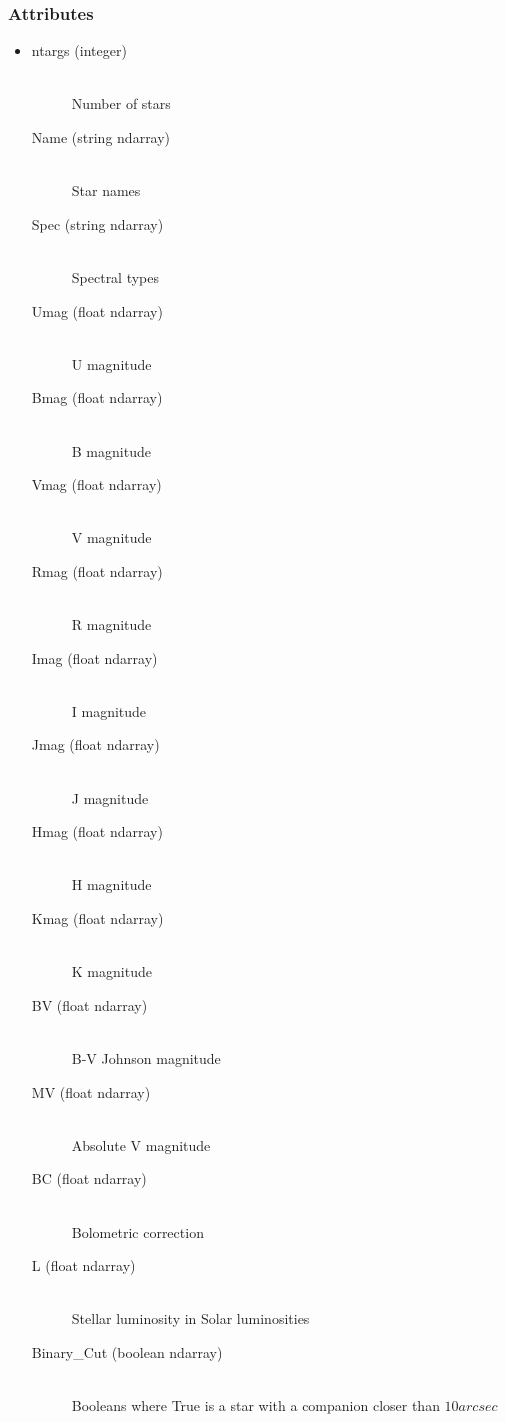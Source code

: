 \documentclass[cleanfoot]{asme2ej}
\begin{document}
\subsubsection*{Attributes}
\begin{itemize}
\item 
\begin{description}
    \item[ntargs (integer)] \hfill \\ Number of stars
    \item[Name (string ndarray)] \hfill \\ Star names
    \item[Spec (string ndarray)] \hfill \\ Spectral types
    \item[Umag (float ndarray)] \hfill \\ U magnitude
    \item[Bmag (float ndarray)] \hfill \\ B magnitude
    \item[Vmag (float ndarray)] \hfill \\ V magnitude
    \item[Rmag (float ndarray)] \hfill \\ R magnitude
    \item[Imag (float ndarray)] \hfill \\ I magnitude
    \item[Jmag (float ndarray)] \hfill \\ J magnitude
    \item[Hmag (float ndarray)] \hfill \\ H magnitude
    \item[Kmag (float ndarray)] \hfill \\ K magnitude
    \item[BV (float ndarray)] \hfill \\ B-V Johnson magnitude
    \item[MV (float ndarray)] \hfill \\ Absolute V magnitude
    \item[BC (float ndarray)] \hfill \\ Bolometric correction
    \item[L (float ndarray)] \hfill \\ Stellar luminosity in Solar luminosities
    \item[Binary\_Cut (boolean ndarray)] \hfill \\ Booleans where True is a star with a companion closer than $ 10 arcsec $

\end{description}
\end{itemize}
\end{document}
